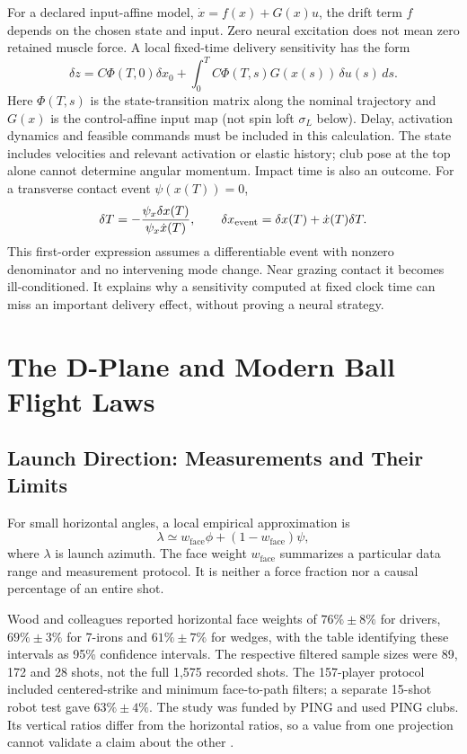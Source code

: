 For a declared input-affine model, $\dot x=f(x)+G(x)u$, the drift term $f$
depends on the chosen state and input. Zero neural excitation does not mean
zero retained muscle force. A local fixed-time delivery sensitivity has the form
\[
\delta z=C\Phi(T,0)\delta x_0+
\int_0^T C\Phi(T,s)G(x(s))\,\delta u(s)\,ds.
\]
Here $\Phi(T,s)$ is the state-transition matrix along the nominal trajectory and
$G(x)$ is the control-affine input map (not spin loft $\sigma_L$ below).
Delay, activation dynamics and feasible commands must be included in this
calculation. The state includes velocities and relevant activation or elastic
history; club pose at the top alone cannot determine angular momentum.
Impact time is also an outcome. For a transverse contact event $\psi(x(T))=0$,
\[
\delta T=-\frac{\psi_x\delta x(T)}{\psi_x\dot x(T)},\qquad
\delta x_{\rm event}=\delta x(T)+\dot x(T)\delta T.
\]
This first-order expression assumes a differentiable event with nonzero
denominator and no intervening mode change. Near grazing contact it becomes
ill-conditioned. It explains why a sensitivity computed at fixed clock time
can miss an important delivery effect, without proving a neural strategy.

\section{The D-Plane and Modern Ball Flight Laws}
\label{sec:d_plane}

\subsection{Launch Direction: Measurements and Their Limits}

For small horizontal angles, a local empirical approximation is
\[
\lambda\simeq w_{\mathrm{face}}\phi+(1-w_{\mathrm{face}})\psi,
\]
where $\lambda$ is launch azimuth. The face weight $w_{\mathrm{face}}$ summarizes
a particular data
range and measurement protocol. It is neither a force fraction nor a causal
percentage of an entire shot.

Wood and colleagues reported horizontal face weights of $76\%\pm8\%$ for
drivers, $69\%\pm3\%$ for 7-irons and $61\%\pm7\%$ for wedges, with the
table identifying these intervals as 95\% confidence intervals. The respective
filtered sample sizes were 89, 172 and 28 shots, not the full 1,575 recorded
shots. The 157-player protocol included centered-strike and minimum face-to-path
filters; a separate 15-shot robot test gave $63\%\pm4\%$. The study was funded
by PING and used PING clubs. Its vertical ratios differ from the horizontal
ratios, so a value from one projection cannot validate a claim about the other
\citep{wood2018launch}.

